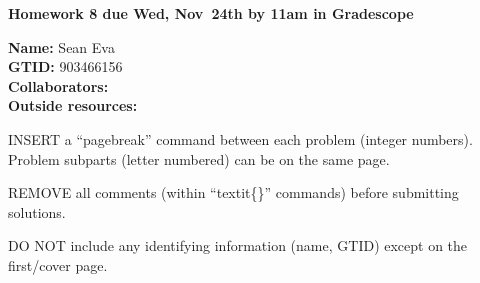 \documentclass[11pt]{article}
\begin{document}
{\noindent\Large\textbf{Homework 8 due Wed, Nov~24th by 11am in Gradescope}}

\vspace{.25in}

{\large
\noindent
\textbf{Name:} Sean Eva\smallskip \\
\textbf{GTID:} 903466156\smallskip \\
\textbf{Collaborators:} \smallskip \\
\textbf{Outside resources:} \smallskip
}

\pagebreak 


INSERT a ``pagebreak'' command between each problem (integer numbers).
Problem subparts (letter numbered) can be on the same page.

REMOVE all comments (within ``textit\{\}'' commands) before submitting
solutions.

DO NOT include any identifying information (name, GTID) except on the
first/cover page.
\end{document}
